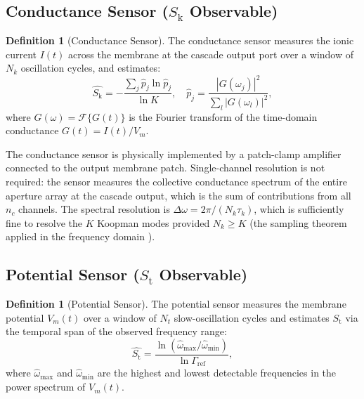 \documentclass[11pt,twocolumn,a4paper]{article}
\theoremstyle{definition}
\newtheorem{definition}[theorem]{Definition}
\theoremstyle{remark}
\newcommand{\Sk}{S_{\mathrm{k}}}
\newcommand{\St}{S_{\mathrm{t}}}
\begin{document}
\subsection{Conductance Sensor ($\Sk$ Observable)}

\begin{definition}[Conductance Sensor]
\label{def:condsensor}
The conductance sensor measures the ionic current $I(t)$ across the membrane
at the cascade output port over a window of $N_k$ oscillation cycles, and
estimates:
\begin{equation}
\hat{\Sk} = -\frac{\sum_j \hat{p}_j \ln \hat{p}_j}{\ln K},
\quad \hat{p}_j = \frac{|G(\omega_j)|^2}{\sum_l |G(\omega_l)|^2},
\label{eq:condest}
\end{equation}
where $G(\omega) = \mathcal{F}\{G(t)\}$ is the Fourier transform of the
time-domain conductance $G(t) = I(t)/V_m$.
\end{definition}

The conductance sensor is physically implemented by a patch-clamp amplifier
\citep{neher1976, sakmann1995} connected to the output membrane patch.
Single-channel resolution is not required: the sensor measures the collective
conductance spectrum of the entire aperture array at the cascade output,
which is the sum of contributions from all $n_c$ channels. The spectral
resolution is $\Delta\omega = 2\pi / (N_k \tau_k)$, which is sufficiently
fine to resolve the $K$ Koopman modes provided $N_k \geq K$
(the sampling theorem applied in the frequency domain \citep{shannon1949}).

\subsection{Potential Sensor ($\St$ Observable)}

\begin{definition}[Potential Sensor]
\label{def:potsensor}
The potential sensor measures the membrane potential $V_m(t)$ over a window of
$N_t$ slow-oscillation cycles and estimates $\St$ via the temporal span of
the observed frequency range:
\begin{equation}
\hat{\St} = \frac{\ln(\hat{\omega}_{\max} / \hat{\omega}_{\min})}{\ln \Gamma_{\mathrm{ref}}},
\label{eq:potest}
\end{equation}
where $\hat{\omega}_{\max}$ and $\hat{\omega}_{\min}$ are the highest and lowest
detectable frequencies in the power spectrum of $V_m(t)$.
\end{definition}
\end{document}
